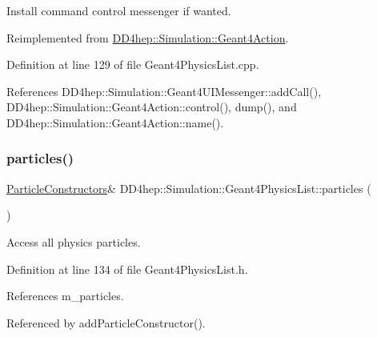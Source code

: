 Install command control messenger if wanted. 



Reimplemented from \hyperlink{class_d_d4hep_1_1_simulation_1_1_geant4_action_aaaa0718b7d4f52e4c31e982b91c0eeda}{D\+D4hep\+::\+Simulation\+::\+Geant4\+Action}.



Definition at line 129 of file Geant4\+Physics\+List.\+cpp.



References D\+D4hep\+::\+Simulation\+::\+Geant4\+U\+I\+Messenger\+::add\+Call(), D\+D4hep\+::\+Simulation\+::\+Geant4\+Action\+::control(), dump(), and D\+D4hep\+::\+Simulation\+::\+Geant4\+Action\+::name().

\hypertarget{class_d_d4hep_1_1_simulation_1_1_geant4_physics_list_a273a6db05b6ea5a2b9a8a2491fbd2d7a}{}\label{class_d_d4hep_1_1_simulation_1_1_geant4_physics_list_a273a6db05b6ea5a2b9a8a2491fbd2d7a} 
\subsubsection{\texorpdfstring{particles()}{particles()}\hspace{0.1cm}{\footnotesize\ttfamily [1/2]}}
{\footnotesize\ttfamily \hyperlink{class_d_d4hep_1_1_simulation_1_1_geant4_physics_list_afaee3763aea79b299830be37f9642342}{Particle\+Constructors}\& D\+D4hep\+::\+Simulation\+::\+Geant4\+Physics\+List\+::particles (\begin{DoxyParamCaption}{ }\end{DoxyParamCaption})\hspace{0.3cm}{\ttfamily [inline]}}



Access all physics particles. 



Definition at line 134 of file Geant4\+Physics\+List.\+h.



References m\+\_\+particles.



Referenced by add\+Particle\+Constructor().

\hypertarget{class_d_d4hep_1_1_simulation_1_1_geant4_physics_list_a605e059b518909ab446396fd5a8035cb}{}\label{class_d_d4hep_1_1_simulation_1_1_geant4_physics_list_a605e059b518909ab446396fd5a8035cb} 
